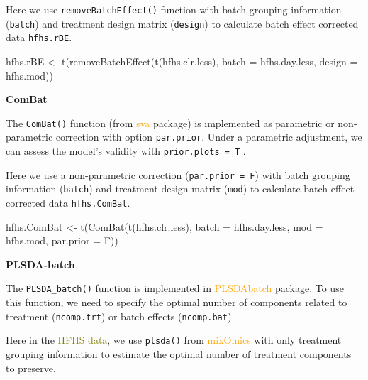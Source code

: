 \documentclass[
]{book}
\newenvironment{Shaded}{\begin{snugshade}}{\end{snugshade}}
\newcommand{\AttributeTok}[1]{\textcolor[rgb]{0.77,0.63,0.00}{#1}}
\newcommand{\FunctionTok}[1]{\textcolor[rgb]{0.00,0.00,0.00}{#1}}
\newcommand{\NormalTok}[1]{#1}
\newcommand{\OtherTok}[1]{\textcolor[rgb]{0.56,0.35,0.01}{#1}}
\begin{document}
Here we use \texttt{removeBatchEffect()} function with batch grouping information (\texttt{batch}) and treatment design matrix (\texttt{design}) to calculate batch effect corrected data \texttt{hfhs.rBE}.

\begin{Shaded}
\begin{Highlighting}[]
\NormalTok{hfhs.rBE }\OtherTok{\textless{}{-}} \FunctionTok{t}\NormalTok{(}\FunctionTok{removeBatchEffect}\NormalTok{(}\FunctionTok{t}\NormalTok{(hfhs.clr.less), }\AttributeTok{batch =}\NormalTok{ hfhs.day.less, }
                                \AttributeTok{design =}\NormalTok{ hfhs.mod))}
\end{Highlighting}
\end{Shaded}

\textbf{ComBat}

The \texttt{ComBat()} function (from \textcolor{orange}{sva} package) is implemented as parametric or non-parametric correction with option \texttt{par.prior}. Under a parametric adjustment, we can assess the model's validity with \texttt{prior.plots\ =\ T} \citep{leek2012sva}.

Here we use a non-parametric correction (\texttt{par.prior\ =\ F}) with batch grouping information (\texttt{batch}) and treatment design matrix (\texttt{mod}) to calculate batch effect corrected data \texttt{hfhs.ComBat}.

\begin{Shaded}
\begin{Highlighting}[]
\NormalTok{hfhs.ComBat }\OtherTok{\textless{}{-}} \FunctionTok{t}\NormalTok{(}\FunctionTok{ComBat}\NormalTok{(}\FunctionTok{t}\NormalTok{(hfhs.clr.less), }\AttributeTok{batch =}\NormalTok{ hfhs.day.less, }
                        \AttributeTok{mod =}\NormalTok{ hfhs.mod, }\AttributeTok{par.prior =}\NormalTok{ F))}
\end{Highlighting}
\end{Shaded}

\textbf{PLSDA-batch}

The \texttt{PLSDA\_batch()} function is implemented in \textcolor{orange}{PLSDAbatch} package. To use this function, we need to specify the optimal number of components related to treatment (\texttt{ncomp.trt}) or batch effects (\texttt{ncomp.bat}).

Here in the \textcolor{olive}{HFHS data}, we use \texttt{plsda()} from \textcolor{orange}{mixOmics} with only treatment grouping information to estimate the optimal number of treatment components to preserve.
\end{document}
